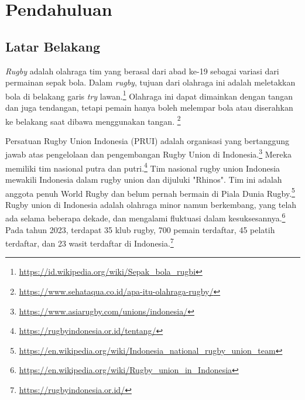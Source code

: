\chapter{Pendahuluan}
\label{chap:intro}
   
\section{Latar Belakang}
\label{sec:label}

\textit{Rugby} adalah olahraga tim yang berasal dari abad ke-19 sebagai variasi dari permainan sepak bola. Dalam \textit{rugby}, tujuan dari olahraga ini adalah meletakkan bola di belakang garis \textit{try} lawan.\footnote{\url{https://id.wikipedia.org/wiki/Sepak_bola_rugbi}} Olahraga ini dapat dimainkan dengan tangan dan juga tendangan, tetapi pemain hanya boleh melempar bola atau diserahkan ke belakang saat dibawa menggunakan tangan. \footnote{\url{https://www.sehataqua.co.id/apa-itu-olahraga-rugby/}}

Persatuan Rugby Union Indonesia (PRUI) adalah organisasi yang bertanggung jawab atas pengelolaan dan pengembangan Rugby Union di Indonesia.\footnote{\url{https://www.asiarugby.com/unions/indonesia/}} Mereka memiliki tim nasional putra dan putri.\footnote{\url{https://rugbyindonesia.or.id/tentang/}} Tim nasional rugby union Indonesia mewakili Indonesia dalam rugby union dan dijuluki "Rhinos". Tim ini adalah anggota penuh World Rugby dan belum pernah bermain di Piala Dunia Rugby.\footnote{\url{https://en.wikipedia.org/wiki/Indonesia_national_rugby_union_team}} Rugby union di Indonesia adalah olahraga minor namun berkembang, yang telah ada selama beberapa dekade, dan mengalami fluktuasi dalam kesuksesannya.\footnote{\url{https://en.wikipedia.org/wiki/Rugby_union_in_Indonesia}} Pada tahun 2023, terdapat 35 klub rugby, 700 pemain terdaftar, 45 pelatih terdaftar, dan 23 wasit terdaftar di Indonesia.\footnote{\url{https://rugbyindonesia.or.id/}}

